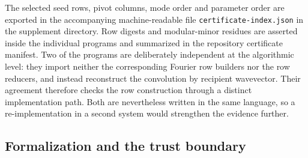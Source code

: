 \documentclass[11pt]{article}
\theoremstyle{definition}
\theoremstyle{remark}
\theoremstyle{plain}
\begin{document}
The selected seed rows, pivot columns, mode order and parameter order are
exported in the accompanying machine-readable file
\texttt{certificate-index.json} in the supplement directory. Row digests and
modular-minor residues are asserted inside the individual programs and
summarized in the repository certificate manifest. Two of the
programs are deliberately independent at the algorithmic level: they import
neither the corresponding Fourier row builders nor the row reducers, and
instead reconstruct the convolution by recipient wavevector. Their agreement
therefore checks the row construction through a distinct implementation path. Both are nevertheless
written in the same language, so a re-implementation in a second system would
strengthen the evidence further.

\subsection{Formalization and the trust boundary}
\label{subsec:lean}
\end{document}
